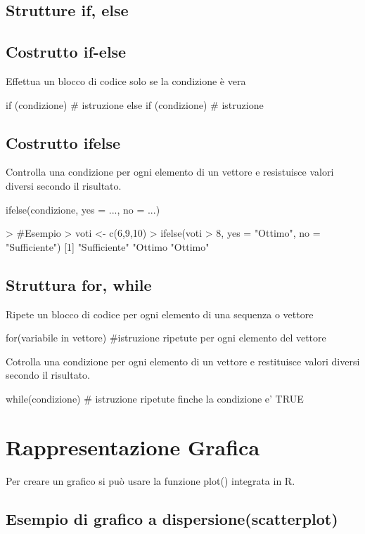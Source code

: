 \subsection{Strutture  if, else}

\subsection*{Costrutto if-else}
Effettua un blocco di codice solo se la condizione è vera
\begin{codiceR}
  if (condizione){
    # istruzione
  } else if (condizione) {
    # istruzione
  }
\end{codiceR}

\subsection*{Costrutto ifelse}
Controlla una condizione per ogni elemento di un vettore e resistuisce valori diversi secondo il risultato.
\begin{codiceR}
  ifelse(condizione, yes = ..., no = ...)

> #Esempio
> voti <- c(6,9,10)
> ifelse(voti > 8, yes = "Ottimo", no = "Sufficiente")
[1] "Sufficiente" "Ottimo "Ottimo"
\end{codiceR}

\subsection{Struttura for, while}
Ripete un blocco di codice per ogni elemento di una sequenza o vettore

\begin{codiceR}
  for(variabile in vettore){
    #istruzione ripetute per ogni elemento del vettore
  }
\end{codiceR}

Cotrolla una condizione per ogni elemento di un vettore e restituisce valori diversi secondo il risultato.

\begin{codiceR}
while(condizione){
  # istruzione ripetute finche la condizione e' TRUE
}
\end{codiceR}


\section{Rappresentazione Grafica}
Per creare un grafico si può usare la funzione plot() integrata in R.

\subsection*{Esempio di grafico a dispersione(scatterplot)}


